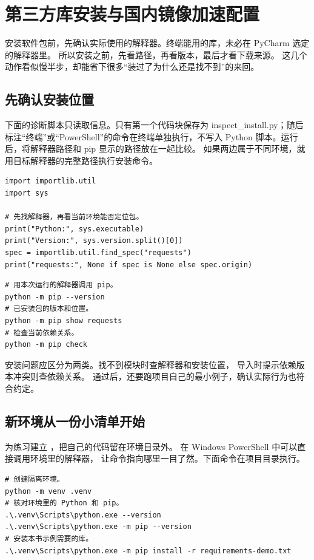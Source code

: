 \chapter{第三方库安装与国内镜像加速配置}

安装软件包前，先确认实际使用的解释器。终端能用的库，未必在 PyCharm 选定的解释器里。
所以安装之前，先看路径，再看版本，最后才看下载来源。
这几个动作看似慢半步，却能省下很多“装过了为什么还是找不到”的来回。

\section{先确认安装位置}

下面的诊断脚本只读取信息。只有第一个代码块保存为 inspect\_install.py；随后标注“终端”或“PowerShell”的命令在终端单独执行，不写入 Python 脚本。运行后，将解释器路径和 pip 显示的路径放在一起比较。
如果两边属于不同环境，就用目标解释器的完整路径执行安装命令。
\begin{lstlisting}[title={\code{inspect_install.py}}]
import importlib.util
import sys

# 先找解释器，再看当前环境能否定位包。
print("Python:", sys.executable)
print("Version:", sys.version.split()[0])
spec = importlib.util.find_spec("requests")
print("requests:", None if spec is None else spec.origin)
\end{lstlisting}

\begin{lstlisting}[language={},title={终端命令（非Python脚本）}]
# 用本次运行的解释器调用 pip。
python -m pip --version
# 已安装包的版本和位置。
python -m pip show requests
# 检查当前依赖关系。
python -m pip check
\end{lstlisting}

安装问题应区分为两类。找不到模块时查解释器和安装位置，
导入时提示依赖版本冲突则查依赖关系。
 通过后，还要跑项目自己的最小例子，确认实际行为也符合约定。

\section{新环境从一份小清单开始}

为练习建立 ，把自己的代码留在环境目录外。
在 Windows PowerShell 中可以直接调用环境里的解释器，
让命令指向哪里一目了然。下面命令在项目目录执行。
\begin{lstlisting}[language={},title={PowerShell终端（非Python脚本）}]
# 创建隔离环境。
python -m venv .venv
# 核对环境里的 Python 和 pip。
.\.venv\Scripts\python.exe --version
.\.venv\Scripts\python.exe -m pip --version
# 安装本书示例需要的库。
.\.venv\Scripts\python.exe -m pip install -r requirements-demo.txt
\end{lstlisting}

